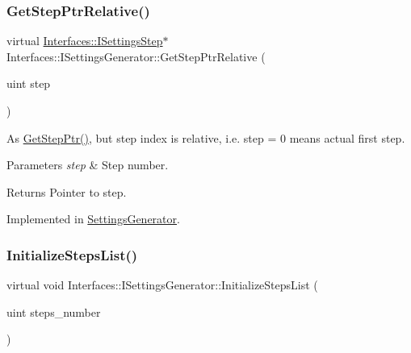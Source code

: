 \subsubsection{\texorpdfstring{Get\+Step\+Ptr\+Relative()}{GetStepPtrRelative()}}
{\footnotesize\ttfamily virtual \hyperlink{class_interfaces_1_1_i_settings_step}{Interfaces\+::\+I\+Settings\+Step}$\ast$ Interfaces\+::\+I\+Settings\+Generator\+::\+Get\+Step\+Ptr\+Relative (\begin{DoxyParamCaption}\item[{uint}]{step }\end{DoxyParamCaption})\hspace{0.3cm}{\ttfamily [pure virtual]}}



As \hyperlink{class_interfaces_1_1_i_settings_generator_af1b65a18c3ade3235715ae2e9cdbcfe0}{Get\+Step\+Ptr()}, but step index is relative, i.\+e. step = 0 means actual first step. 


\begin{DoxyParams}{Parameters}
{\em step} & Step number. \\
\hline
\end{DoxyParams}
\begin{DoxyReturn}{Returns}
Pointer to step. 
\end{DoxyReturn}


Implemented in \hyperlink{class_settings_generator_aa45d5a3c1349c18ac611ad960ff8470d}{Settings\+Generator}.

\mbox{\label{class_interfaces_1_1_i_settings_generator_a4aa0307e906c003012aad75101072c65}} 
\subsubsection{\texorpdfstring{Initialize\+Steps\+List()}{InitializeStepsList()}}
{\footnotesize\ttfamily virtual void Interfaces\+::\+I\+Settings\+Generator\+::\+Initialize\+Steps\+List (\begin{DoxyParamCaption}\item[{uint}]{steps\+\_\+number }\end{DoxyParamCaption})\hspace{0.3cm}{\ttfamily [pure virtual]}}



